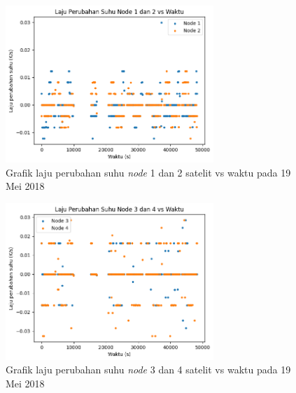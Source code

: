 \begin{figure}[H]
\setlength{}
\begin{center}
\includegraphics[width=0.7\textwidth]{fig/base_node12_tempchange_2018-05-19.png}
	\caption{Grafik laju perubahan suhu \textit{node} 1 dan 2 satelit vs waktu pada 19 Mei 2018}
\label{fig:basetempchange1219}
\end{center}
\end{figure}

\begin{figure}[H]
\setlength{}
\begin{center}
\includegraphics[width=0.7\textwidth]{fig/base_node34_tempchange_2018-05-19.png}
	\caption{Grafik laju perubahan suhu \textit{node} 3 dan 4 satelit vs waktu pada 19 Mei 2018}
\label{fig:basetempchange3419}
\end{center}
\end{figure}

